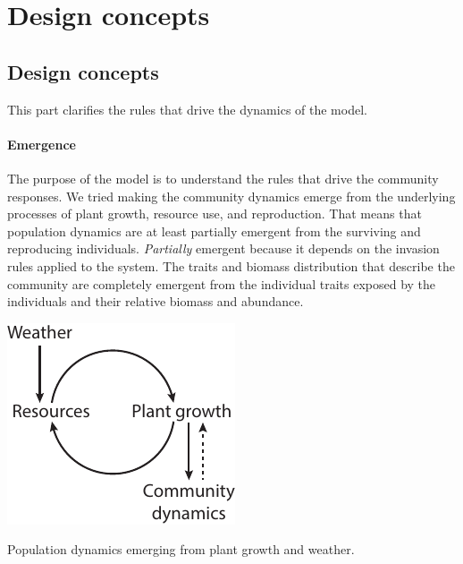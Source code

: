 \section{Design concepts}

\subsection{Design concepts}
This part clarifies the rules that drive the dynamics of the model.

\paragraph{Emergence} 
The purpose of the model is to understand the rules that drive the community responses. We tried making the community dynamics emerge from the underlying processes of plant growth, resource use, and reproduction. That means that population dynamics are at least partially emergent from the surviving and reproducing individuals.
\textit{Partially} emergent because it depends on the invasion rules applied to the system. The traits and biomass distribution that describe the community are completely emergent from the individual traits exposed by the individuals and their relative biomass and abundance.
\begin{marginfigure}
\includegraphics{./Figures/emergence.pdf}
\caption{Population dynamics emerging from plant growth and weather.}
\end{marginfigure}


